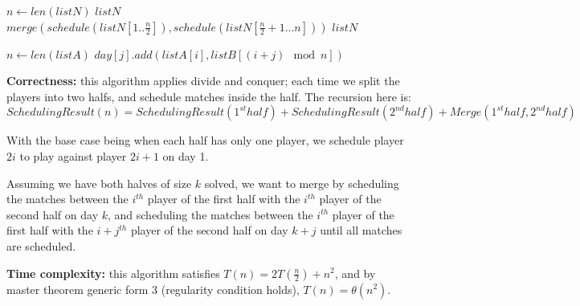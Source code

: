 \documentclass{article}
\begin{document}
\begin{description}
\begin{algorithm}[H]
\begin{algorithmic}[1]
      \State $n \gets len(listN)$
        \State \Return $listN$
      \EndIf
      \State $merge(schedule(listN[1..\frac{n}{2}]), schedule(listN[\frac{n}{2}+1...n]))$
      \State \Return $listN$
    \EndFunction

      \State $n \gets len(listA)$
          \State $day[j].add(listA[i], listB[(i+j) \mod n])$
        \EndFor
      \EndFor
    \EndFunction

    \end{algorithmic}
  \end{algorithm}

  \textbf{Correctness:} this algorithm applies divide and conquer; each time we split the players into two halfs, and schedule matches inside the half. The recursion here is: 
  $$SchedulingResult(n) = SchedulingResult(1^{st} half) + SchedulingResult(2^{nd} half) + Merge(1^{st} half, 2^{nd} half)$$ 

  With the base case being when each half has only one player, we schedule player $2i$ to play against player $2i+1$ on day 1. 

  Assuming we have both halves of size $k$ solved, we want to merge by scheduling the matches between the $i^{th}$ player of the first half with the $i^{th}$ player of the second half on day $k$, and scheduling the matches between the $i^{th}$ player of the first half with the $i+j^{th}$ player of the second half on day $k+j$ until all matches are scheduled.

  \textbf{Time complexity:} this algorithm satisfies $T(n) = 2T(\frac{n}{2}) + n^2$, and by master theorem generic form 3 (regularity condition holds), $T(n) = \theta(n^2)$.

\end{description}
\end{document}
